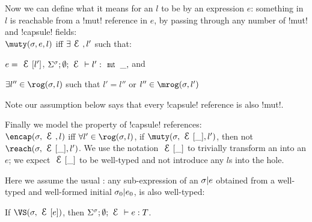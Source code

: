 \noindent Now we can define what it means for an $l$ to be \muty by an expression $e$: something in $l$ is reachable from a \Q!mut! reference in $e$, by passing through any number of \Q!mut! and \Q!capsule! fields:\\
\indent $\muty(\s, e, l)$ iff $\exists \E,l'$ such that:
\begin{iitemize}
	\item $e = \E[l']$, $\tyr{l'}{\Kw{mut}\,\_,}$ and
	\item $\exists l'' \in \rog(\s, l)$ such that $l' = l''$ or $l'' \in \mrog(\s, l')$
\end{iitemize}

\noindent Note our  assumption below says that every \Q!capsule! reference is also \Q!mut!.

\noindent Finally we model the \encap property of \Q!capsule! references:\\
\indent $\encap(\s, \E, l)$ iff $\forall l' \in \rog(\s, l)$, if $\muty(\s, \E[\_], l')$, then 
not $\reach(\s, \E[\_], l')$.
We use the notation $\E[\_]$ to trivially transform an \E into an $e$; we expect $\E[\_]$ to be well-typed and not introduce any $l$s into the hole.


Here we assume the usual : any sub-expression of an $\sigma|e$ obtained from a well-typed and well-formed initial $\sigma_0|e_0$, is also well-typed:%
\SS\begin{Assumption}\rm
	If $\VS(\s, \E[e])$, then $\Ss; \emptyset; \E \vdash e : T$.\\
\end{Assumption}


